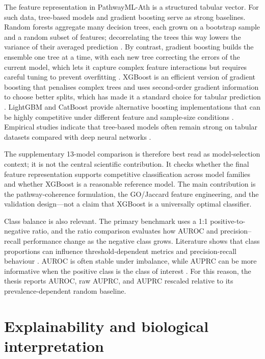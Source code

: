 \documentclass[12pt,letterpaper,oneside,openany]{book}
\begin{document}
The feature representation in PathwayML-Ath is a structured tabular vector. For such data, tree-based models and gradient boosting serve as strong baselines. Random forests aggregate many decision trees, each grown on a bootstrap sample and a random subset of features; decorrelating the trees this way lowers the variance of their averaged prediction \citep{breiman2001random}. By contrast, gradient boosting builds the ensemble one tree at a time, with each new tree correcting the errors of the current model, which lets it capture complex feature interactions but requires careful tuning to prevent overfitting \citep{friedman2001greedy}. XGBoost is an efficient version of gradient boosting that penalises complex trees and uses second-order gradient information to choose better splits, which has made it a standard choice for tabular prediction \citep{chen2016xgboost}. LightGBM and CatBoost provide alternative boosting implementations that can be highly competitive under different feature and sample-size conditions \citep{ke2017lightgbm,prokhorenkova2018catboost}. Empirical studies indicate that tree-based models often remain strong on tabular datasets compared with deep neural networks \citep{grinsztajn2022why}.

The supplementary 13-model comparison is therefore best read as model-selection context; it is not the central scientific contribution. It checks whether the final feature representation supports competitive classification across model families and whether XGBoost is a reasonable reference model. The main contribution is the pathway-coherence formulation, the GO/Jaccard feature engineering, and the validation design---not a claim that XGBoost is a universally optimal classifier.

Class balance is also relevant. The primary benchmark uses a 1:1 positive-to-negative ratio, and the ratio comparison evaluates how AUROC and precision--recall performance change as the negative class grows. Literature shows that class proportions can influence threshold-dependent metrics and precision-recall behaviour \citep{japkowicz2002class}. AUROC is often stable under imbalance, while AUPRC can be more informative when the positive class is the class of interest \citep{saito2015precision}. For this reason, the thesis reports AUROC, raw AUPRC, and AUPRC rescaled relative to its prevalence-dependent random baseline.

\section{Explainability and biological interpretation}
\label{sec:lit_xai}
\end{document}
